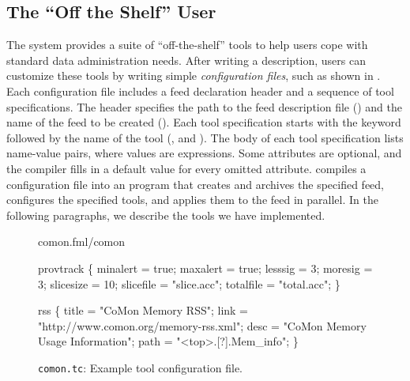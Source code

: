 \subsection{The ``Off the Shelf'' User}
\label{sec:tools}
The \padsd{} system provides a suite of ``off-the-shelf'' tools to
help users cope with standard data administration needs.  After writing
a \padsd{} description, users can customize these tools by
writing simple {\em configuration files}, such as shown in
.   
Each configuration file includes a feed declaration header 
and a sequence of tool specifications. The header specifies the path to the 
feed description file () and the name of the feed to be created ().
Each tool specification starts with the keyword  followed by the
name of the tool (\eg{},  and ). The body of each tool specification 
lists name-value pairs, where values are \ocaml{} expressions. Some attributes are 
optional, and the compiler fills in a default value for every omitted attribute.
\padsd{} compiles a configuration file into an \ocaml{} program that creates and archives the specified 
feed, configures the specified tools, and applies them to the feed in parallel.
In the following paragraphs, we describe the tools we have implemented.

\begin{figure}[t]
\centering
\begin{codebox}
 comon.fml/comon

 provtrack
\{
  minalert  = true;
  maxalert  = true;
  lesssig   = 3;
  moresig   = 3;
  slicesize = 10;
  slicefile = "slice.acc";
  totalfile = "total.acc";
\}

 rss
\{
  title = "CoMon Memory RSS";
  link  = "http://www.comon.org/memory-rss.xml";
  desc  = "CoMon Memory Usage Information";
  path  = "<top>.[?].Mem_info";
\}
\end{codebox}
\caption{\texttt{comon.tc}: Example tool configuration file.}
\label{fig:toolconfigs}
\end{figure}






